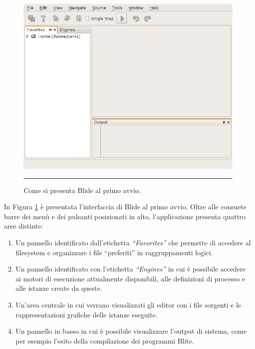 \begin{figure}[t!]
\begin{center}
\includegraphics[scale=0.60]
{blide/dia/Blide1}
\caption[Blide Schermata]{Come si presenta Blide al primo avvio.}
\rule{7cm}{0.01cm}
  \label{fig:blide1}
\end{center}
\end{figure}

In Figura \ref{fig:blide1} è presentata l'interfaccia di Blide al primo avvio. 
Oltre alle consuete barre dei menù e dei pulsanti posizionati in alto,
l'applicazione presenta quattro aree distinte:

\begin{enumerate}
  \item Un pannello identificato dall'etichetta \emph{``Favorites''} che
  permette di accedere al filesystem e organizzare i file ``preferiti''
  in raggruppamenti logici.
  \item Un pannello identificato con l'etichetta \emph{``Engines''} in cui è
  possibile accedere ai motori di esecuzione attualmente disponibili, alle
  definizioni di processo e alle istanze create da queste.
  \item Un'area centrale in cui verrano visualizzati gli editor con i file
  sorgenti e le rappresentazioni grafiche delle istanze eseguite.
  \item Un pannello in basso in cui è possibile visualizzare l'output di
  sistema, come per esempio l'esito della compilazione dei programmi Blite.
\end{enumerate}

